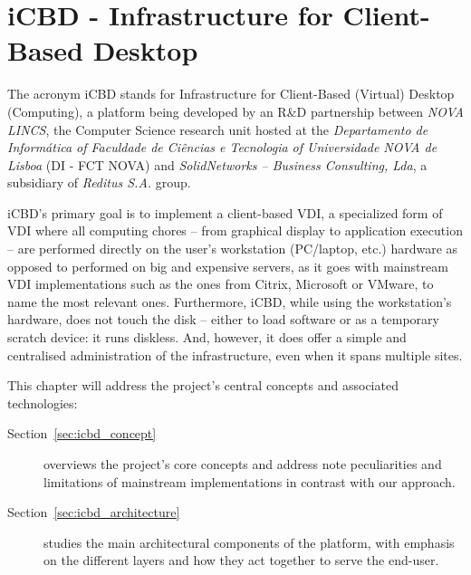 

\chapter{iCBD - Infrastructure for Client-Based Desktop}
\label{cha:icbd}

The acronym iCBD stands for Infrastructure for Client-Based (Virtual) Desktop (Computing), a platform being developed by an R\&D partnership between\textit{ NOVA LINCS}, the Computer Science research unit hosted at the \textit{Departamento de Informática of Faculdade de Ciências e Tecnologia of Universidade NOVA de Lisboa} (DI - FCT NOVA) and \textit{SolidNetworks – Business Consulting, Lda}, a subsidiary of \textit{Reditus S.A.} group. 

iCBD’s primary goal is to implement a client-based VDI, a specialized form of \gls{VDI} where all computing chores – from graphical display to application execution – are performed directly on the user’s workstation (PC/laptop, etc.) hardware as opposed to performed on big and expensive servers, as it goes with mainstream VDI implementations such as the ones from Citrix, Microsoft or VMware, to name the most relevant ones. Furthermore, iCBD, while using the workstation’s hardware, does not touch the disk – either to load software or as a temporary scratch device: it runs diskless. And, however, it does offer a simple and centralised administration of the infrastructure, even when it spans multiple sites.

This chapter will address the project’s central concepts and associated technologies:

\begin{description}
	\item [Section~\ref{sec:icbd_concept}] overviews the project’s core concepts and address note peculiarities and limitations of mainstream implementations in contrast with our approach.
	\item [Section~\ref{sec:icbd_architecture}] studies the main architectural components of the platform, with emphasis on the different layers and how they act together to serve the end-user.
\end{description}
\newpage


